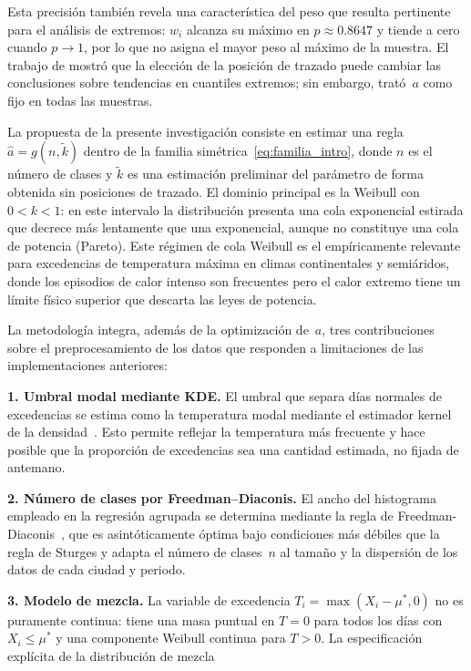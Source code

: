 \documentclass[APA,STIX1COL]{WileyNJD-v2}
\begin{document}
{Esta precisión tambi\'en revela una caracter\'istica del peso que
resulta pertinente para el an\'alisis de extremos: $w_i$ alcanza su
m\'aximo en $p\approx 0.8647$ y tiende a cero cuando $p\to 1$, por
lo que no asigna el mayor peso al m\'aximo de la muestra. El trabajo
de \citet{olivera2019} mostr\'o que la elecci\'on de la posici\'on
de trazado puede cambiar las conclusiones sobre tendencias en
cuantiles extremos; sin embargo, trat\'o~$a$ como fijo en todas las
muestras.

La propuesta de la presente investigaci\'on consiste en estimar una
regla $\hat{a}=g(n,\tilde{k})$ dentro de la familia
sim\'etrica~\eqref{eq:familia_intro}, donde $n$ es el n\'umero de
clases y $\tilde{k}$ es una estimaci\'on preliminar del par\'ametro
de forma obtenida sin posiciones de trazado. El dominio principal
es la Weibull con $0<k<1$: en este intervalo la distribuci\'on
presenta una cola exponencial estirada que decrece m\'as lentamente
que una exponencial, aunque no constituye una cola de potencia
(Pareto). Este r\'egimen de cola Weibull \citep{gardes2005,
diebolt2008} es el emp\'iricamente relevante para excedencias de
temperatura m\'axima en climas continentales y semi\'aridos, donde
los episodios de calor intenso son frecuentes pero el calor extremo
tiene un l\'imite f\'isico superior que descarta las leyes de potencia.


La metodología integra, además de la optimización de~$a$, tres contribuciones sobre el preprocesamiento de los datos que responden a limitaciones de las implementaciones anteriores:

\textbf{1. Umbral modal mediante KDE.}
El umbral que separa días normales de
excedencias se estima como la temperatura modal mediante el estimador kernel de la densidad~\citep{rosenblatt1956,parzen1962}. Esto permite reflejar la temperatura más
frecuente y hace posible que la proporción de excedencias sea una cantidad estimada, no fijada de antemano.

\textbf{2. Número de clases por Freedman--Diaconis.}
El ancho del histograma empleado en la regresión agrupada se determina mediante la regla de Freedman-Diaconis~\citeyearpar{freedman1981},
que es asintóticamente óptima bajo condiciones más débiles que la regla de Sturges y adapta el número de clases~$n$ al
tamaño y la dispersión de los datos de cada ciudad y periodo.

\textbf{3. Modelo de mezcla.}
La variable de excedencia $T_i=\max(X_i-\mu^*,0)$ no es puramente continua: tiene una masa puntual en $T=0$ para todos los días con
$X_i\leq\mu^*$ y una componente Weibull continua para $T>0$. La especificación explícita de la distribución de mezcla

}
\end{document}
